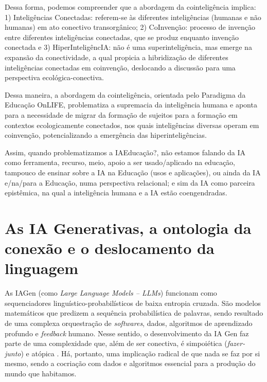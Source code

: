 \documentclass[portuguese]{textolivre}
\begin{document}
Dessa forma, podemos compreender que a abordagem da cointeligência implica: 1) Inteligências Conectadas: referem-se às diferentes inteligências (humanas e não humanas) em ato conectivo transorgânico; 2) CoInvenção: processo de invenção entre diferentes inteligências conectadas, que se produz enquanto invenção conectada e 3) HiperInteligêncIA: não é uma superinteligência, mas emerge na expansão da conectividade, a qual propicia a hibridização de diferentes inteligências conectadas em coinvenção, deslocando a discussão para uma perspectiva ecológica-conectiva.

Dessa maneira, a abordagem da cointeligência, orientada pelo Paradigma da Educação OnLIFE, problematiza a supremacia da inteligência humana e aponta para a necessidade de migrar da formação de sujeitos para a formação em contextos ecologicamente conectados, nos quais inteligências diversas operam em coinvenção, potencializando a emergência das hiperinteligências.

Assim, quando problematizamos a IAEducação?, não estamos falando da IA como ferramenta, recurso, meio, apoio a ser usado/aplicado na educação, tampouco de ensinar sobre a IA na Educação (usos e aplicações), ou ainda da IA e/na/para a Educação, numa perspectiva relacional; e sim da IA como parceira epistêmica, na qual a inteligência humana e a IA estão coengendradas.

\section {As IA Generativas, a ontologia da conexão e o deslocamento da linguagem}\label{sec-4}

As IAGen (como \textit{Large Language Models – LLMs}) funcionam como sequenciadores linguístico-probabilísticos de baixa entropia cruzada. São modelos matemáticos que predizem a sequência probabilística de palavras, sendo resultado de uma complexa orquestração de \textit{softwares}, dados, algoritmos de aprendizado profundo e \textit{feedback} humano. Nesse sentido, o desenvolvimento da IA Gen faz parte de uma complexidade que, além de ser conectiva, é simpoiética (\textit{fazer-junto}) \cite{haraway2016staying} e atópica \cite{difelice2012redessociais}. Há, portanto, uma implicação radical de que nada se faz por si mesmo, sendo a cocriação com dados e algoritmos essencial para a produção do mundo que habitamos.
\end{document}
